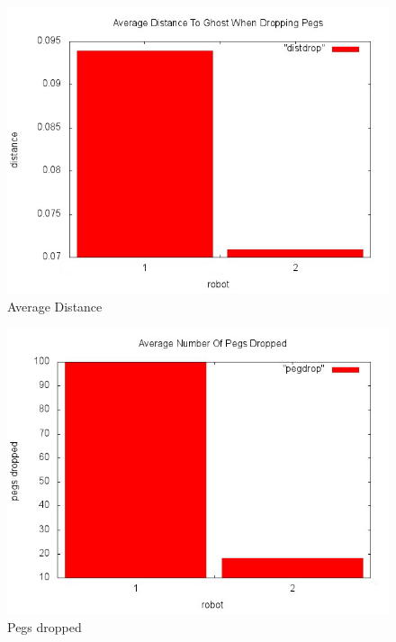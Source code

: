 \documentclass[12pt,fleqn,a4paper]{article}
\begin{document}
\begin{figure}[h]
\centering
\includegraphics[scale=0.5]{img/distdrop_plot.png}
\caption{Average Distance}
\label{fig:Average Distance}
\end{figure}

\begin{figure}[h]
\centering
\includegraphics[scale=0.5]{img/pegdrop_plot.png}
\caption{Pegs dropped}
\label{fig:Pegs dropped}
\end{figure}
\end{document}
